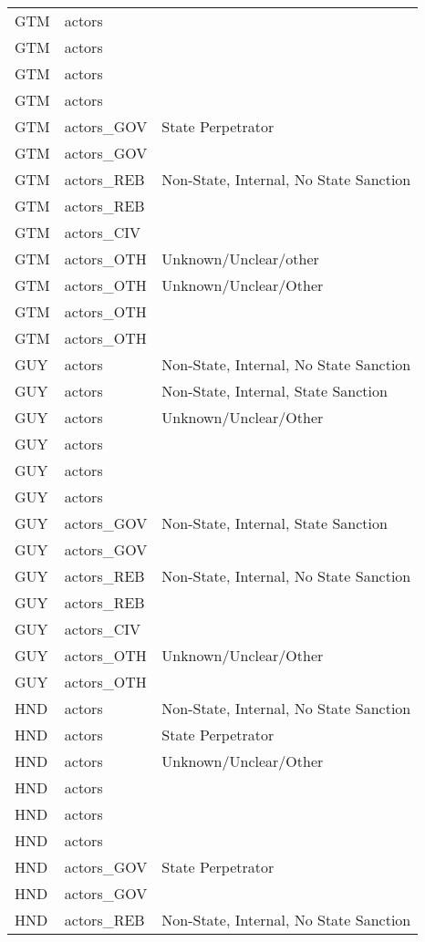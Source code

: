 \begin{table}[ht]
\begin{tabular}{lll}
  GTM & actors &  \\ 
  GTM & actors &  \\ 
  GTM & actors &  \\ 
  GTM & actors &  \\ 
  GTM & actors\_GOV & State Perpetrator \\ 
  GTM & actors\_GOV &  \\ 
  GTM & actors\_REB & Non-State, Internal, No State Sanction \\ 
  GTM & actors\_REB &  \\ 
  GTM & actors\_CIV &  \\ 
  GTM & actors\_OTH & Unknown/Unclear/other \\ 
  GTM & actors\_OTH & Unknown/Unclear/Other \\ 
  GTM & actors\_OTH &  \\ 
  GTM & actors\_OTH &  \\ 
  GUY & actors & Non-State, Internal, No State Sanction \\ 
  GUY & actors & Non-State, Internal, State Sanction \\ 
  GUY & actors & Unknown/Unclear/Other \\ 
  GUY & actors &  \\ 
  GUY & actors &  \\ 
  GUY & actors &  \\ 
  GUY & actors\_GOV & Non-State, Internal, State Sanction \\ 
  GUY & actors\_GOV &  \\ 
  GUY & actors\_REB & Non-State, Internal, No State Sanction \\ 
  GUY & actors\_REB &  \\ 
  GUY & actors\_CIV &  \\ 
  GUY & actors\_OTH & Unknown/Unclear/Other \\ 
  GUY & actors\_OTH &  \\ 
  HND & actors & Non-State, Internal, No State Sanction \\ 
  HND & actors & State Perpetrator \\ 
  HND & actors & Unknown/Unclear/Other \\ 
  HND & actors &  \\ 
  HND & actors &  \\ 
  HND & actors &  \\ 
  HND & actors\_GOV & State Perpetrator \\ 
  HND & actors\_GOV &  \\ 
  HND & actors\_REB & Non-State, Internal, No State Sanction \\ 

\end{tabular}
\end{table}
